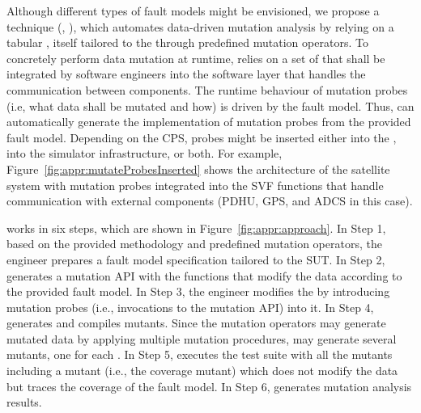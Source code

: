 Although different types of fault models might be envisioned,
we propose a technique (, \APPR),
which automates data-driven mutation analysis by relying on
a tabular , itself tailored to the  through predefined mutation operators.
To concretely perform data mutation at runtime, \APPR relies on a set of  that shall be integrated by software engineers into the software layer that handles the communication between components. The runtime behaviour of mutation probes (i.e, what data shall be mutated and how) is driven by the fault model. Thus, \APPR can automatically generate the implementation of mutation probes from the provided fault model.
Depending on the CPS, probes might be inserted either into the , into the simulator infrastructure, or both.
For example, Figure~\ref{fig:appr:mutateProbesInserted} shows the architecture of the \ESAIL satellite system with mutation probes integrated into the SVF
functions that handle communication with external components (PDHU, GPS, and ADCS in this case). 






\APPR works in six steps, which are shown in Figure~\ref{fig:appr:approach}. 
In Step 1, based on the provided methodology and predefined mutation operators, the engineer prepares a fault model specification tailored to the SUT.
In Step 2, \APPR generates a mutation API with the functions that modify the data according to the provided fault model.
In Step 3, the engineer modifies the  by introducing mutation probes (i.e., invocations to the mutation API) into it.
In Step 4, \APPR generates and compiles mutants. 
Since the \APPR mutation operators may generate mutated data by applying multiple mutation procedures, \APPR may generate several mutants, one for each .
In Step 5, \APPR executes the test suite with all the mutants including a mutant (i.e., the coverage mutant) which does not  modify the data but traces the coverage of the fault model.
In Step 6, \APPR generates mutation analysis results.

